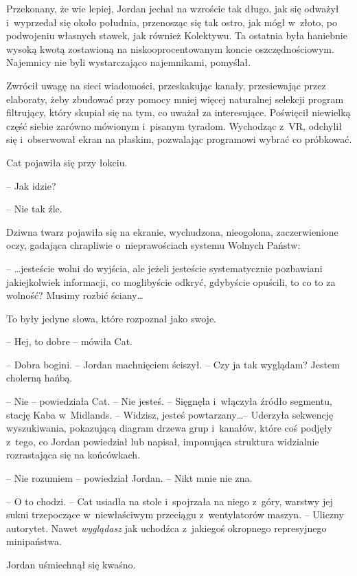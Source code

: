 \documentclass[oneside,polish,11pt,sfheadings]{mwbk}
\begin{document}
Przekonany, że wie lepiej, Jordan jechał na wzroście tak długo, jak się
odważył i~wyprzedał się około południa, przenosząc się tak ostro, jak
mógł w~złoto, po podwojeniu własnych stawek, jak również Kolektywu. Ta
ostatnia była haniebnie wysoką kwotą zostawioną na niskooprocentowanym
koncie oszczędnościowym. Najemnicy nie byli wystarczająco najemnikami,
pomyślał.

Zwrócił uwagę na sieci wiadomości, przeskakując kanały, przesiewając
przez elaboraty, żeby zbudować przy pomocy mniej więcej naturalnej
selekcji program filtrujący, który skupiał się na tym, co uważał za
interesujące. Poświęcił niewielką część siebie zarówno mówionym i~pisanym tyradom. Wychodząc z~VR, odchylił się i~obserwował ekran na
płaskim, pozwalając programowi wybrać co próbkować.

Cat pojawiła się przy łokciu.

-- Jak idzie?

-- Nie tak źle.

Dziwna twarz pojawiła się na ekranie, wychudzona, nieogolona,
zaczerwienione oczy, gadająca chrapliwie o~nieprawościach systemu
Wolnych Państw: 

-- \ldots jesteście wolni do wyjścia, ale jeżeli jesteście
systematycznie pozbawiani jakiejkolwiek informacji, co moglibyście
odkryć, gdybyście opuścili, to co to za wolność? Musimy rozbić ściany\ldots

To były jedyne słowa, które rozpoznał jako swoje.

-- Hej, to dobre -- mówiła Cat.

-- Dobra bogini. -- Jordan machnięciem ściszył. -- Czy ja tak wyglądam?
Jestem cholerną hańbą.

-- Nie -- powiedziała Cat. -- Nie jesteś. -- Sięgnęła i~włączyła źródło
segmentu, stację Kaba w~Midlands. -- Widzisz, jesteś powtarzany\ldots -- Uderzyła sekwencję wyszukiwania, pokazującą diagram drzewa grup i~kanałów, które coś podjęły z~tego, co Jordan powiedział lub napisał,
imponująca struktura widzialnie rozrastająca się na końcówkach.

-- Nie rozumiem -- powiedział Jordan. -- Nikt mnie nie zna.

-- O to chodzi. -- Cat usiadła na stole i~spojrzała na niego z~góry,
warstwy jej sukni trzepoczące w~niewłaściwym przeciągu z~wentylatorów
maszyn. -- Uliczny autorytet. Nawet \emph{wyglądasz} jak uchodźca z~jakiegoś okropnego represyjnego minipaństwa.

Jordan uśmiechnął się kwaśno. 
\end{document}
